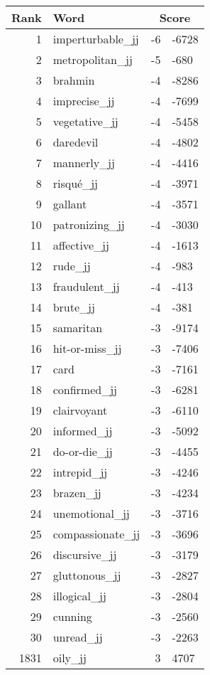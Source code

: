 \begin{longtable}[!htbp]{| rlr@{.}l |}
    \hline
    \textbf{Rank} & \textbf{Word} & \multicolumn{2}{c|}{\textbf{Score}} \\
    \hline
    \endhead
    1 & imperturbable\_jj & -6 & -6728 \\
    2 & metropolitan\_jj & -5 & -680 \\
    3 & brahmin & -4 & -8286 \\
    4 & imprecise\_jj & -4 & -7699 \\
    5 & vegetative\_jj & -4 & -5458 \\
    6 & daredevil & -4 & -4802 \\
    7 & mannerly\_jj & -4 & -4416 \\
    8 & risqué\_jj & -4 & -3971 \\
    9 & gallant & -4 & -3571 \\
    10 & patronizing\_jj & -4 & -3030 \\
    11 & affective\_jj & -4 & -1613 \\
    12 & rude\_jj & -4 & -983 \\
    13 & fraudulent\_jj & -4 & -413 \\
    14 & brute\_jj & -4 & -381 \\
    15 & samaritan & -3 & -9174 \\
    16 & hit-or-miss\_jj & -3 & -7406 \\
    17 & card & -3 & -7161 \\
    18 & confirmed\_jj & -3 & -6281 \\
    19 & clairvoyant & -3 & -6110 \\
    20 & informed\_jj & -3 & -5092 \\
    21 & do-or-die\_jj & -3 & -4455 \\
    22 & intrepid\_jj & -3 & -4246 \\
    23 & brazen\_jj & -3 & -4234 \\
    24 & unemotional\_jj & -3 & -3716 \\
    25 & compassionate\_jj & -3 & -3696 \\
    26 & discursive\_jj & -3 & -3179 \\
    27 & gluttonous\_jj & -3 & -2827 \\
    28 & illogical\_jj & -3 & -2804 \\
    29 & cunning & -3 & -2560 \\
    30 & unread\_jj & -3 & -2263 \\
    1831 & oily\_jj & 3 & 4707 \\

\end{longtable}
